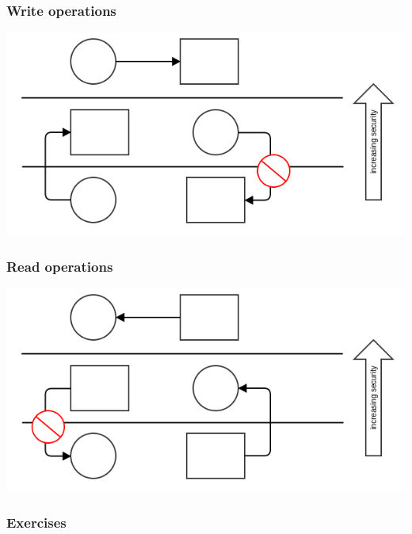 \documentclass[10pt]{beamer}
\begin{document}
\begin{frame}
	\frametitle{Write operations}
	
	\includegraphics[scale=0.5]{blp-write.png}
\end{frame}

\begin{frame}
	\frametitle{Read operations}
	
	\includegraphics[scale=0.5]{blp-read.png}
\end{frame}

\begin{frame}
	\frametitle{Exercises}
\end{frame}
\end{document}
